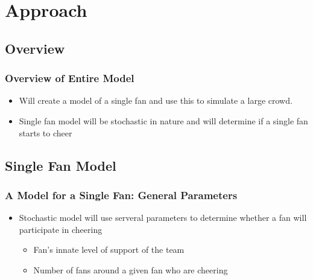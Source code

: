 \documentclass[compress,handout,10pt]{beamer}
\let\olditem\item
\renewcommand{\item}{\setlength{\itemsep}{0.5\baselineskip}\olditem}
\begin{document}
\section {Approach}

\subsection {Overview}

\begin {frame}
	\frametitle {Overview of Entire Model}
	\begin{itemize}
		\item Will create a model of a single fan and use this to simulate a large crowd.
		\item Single fan model will be stochastic in nature and will determine if a single fan starts to cheer
	\end{itemize}
\end {frame}

\subsection{Single Fan Model}

\begin {frame}
	\frametitle {A Model for a Single Fan: General Parameters}
	\begin{itemize}
		\item Stochastic model will use serveral parameters to determine whether a fan will participate in cheering
		\begin{itemize}
			\item Fan's innate level of support of the team
			\item Number of fans around a given fan who are cheering
		\end{itemize}
	\end {itemize}
\end {frame}
\end{document}
